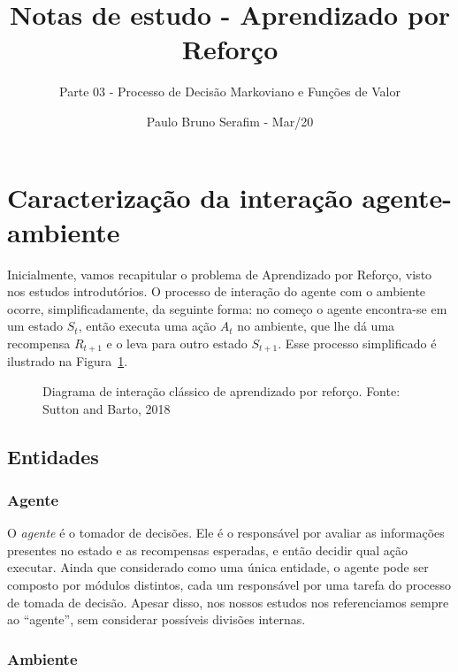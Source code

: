 \documentclass{article}
\title{Notas de estudo - Aprendizado por Reforço}
\author{Parte 03 - Processo de Decisão Markoviano e Funções de Valor}
\date{Paulo Bruno Serafim - Mar/20}
\begin{document}
\maketitle

    \section{Caracterização da interação agente-ambiente}
    
        Inicialmente, vamos recapitular o problema de Aprendizado por Reforço, visto nos estudos introdutórios. O processo de interação do agente com o ambiente ocorre, simplificadamente, da seguinte forma: no começo o agente encontra-se em um estado $S_t$, então executa uma ação $A_t$ no ambiente, que lhe dá uma recompensa $R_{t+1}$ e o leva para outro estado $S_{t+1}$. Esse processo simplificado é ilustrado na Figura~\ref{diag:classical-rl}.
                
        \begin{figure}[ht]
            \centering
            \vspace*{5mm}
            \rlinteraction
            \vspace*{-5mm}
            \caption{Diagrama de interação clássico de aprendizado por reforço. Fonte: Sutton and Barto, 2018}
            \label{diag:classical-rl}
        \end{figure}
        
        \subsection{Entidades}
            
            \subsubsection{Agente}
            
                O \emph{agente} é o tomador de decisões. Ele é o responsável por avaliar as informações presentes no estado e as recompensas esperadas, e então decidir qual ação executar. Ainda que considerado como uma única entidade, o agente pode ser composto por módulos distintos, cada um responsável por uma tarefa do processo de tomada de decisão. Apesar disso, nos nossos estudos nos referenciamos sempre ao ``agente'', sem considerar possíveis divisões internas.
            
            \subsubsection{Ambiente}
            
\end{document}
